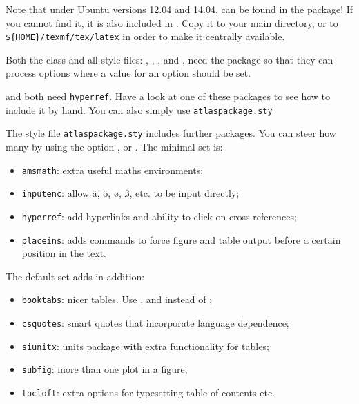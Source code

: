 Note that under Ubuntu versions 12.04 and 14.04,  can be found in the
 package!
If you cannot find it, it is also included in .
Copy it to your main directory, or to \verb|${HOME}/texmf/tex/latex| in order to make
it centrally available.

Both the class  and all style files:
, , ,  and ,
need the package  
so that they can process options where a value for an option should be set.

 and  both need \texttt{hyperref}. 
Have a look at one of these packages to see how to include it by hand.
You can also simply use \texttt{atlaspackage.sty}

The style file \texttt{atlaspackage.sty} includes further packages.
You can steer how many by using the option ,  or .
The minimal set is:
\begin{itemize}\setlength{\parskip}{0pt}\setlength{\itemsep}{0pt}
\item \texttt{amsmath}: extra useful maths environments;
\item \texttt{inputenc}: allow ä, ö, ø, ß, etc. to be input directly;
\item \texttt{hyperref}: add hyperlinks and ability to click on cross-references;
\item \texttt{placeins}: adds commands to force figure and table output before a certain position in the text.
\end{itemize}

The default set adds in addition:
\begin{itemize}\setlength{\parskip}{0pt}\setlength{\itemsep}{0pt}
\item \texttt{booktabs}: nicer tables. Use ,  and  instead of ;
\item \texttt{csquotes}: smart quotes that incorporate language dependence;
\item \texttt{siunitx}: units package with extra functionality for tables;
\item \texttt{subfig}: more than one plot in a figure;
\item \texttt{tocloft}: extra options for typesetting table of contents etc.
\end{itemize}

